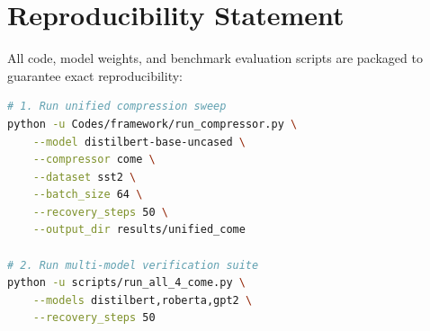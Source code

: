 \section{Reproducibility Statement}
All code, model weights, and benchmark evaluation scripts are packaged to guarantee exact reproducibility:
\begin{lstlisting}[language=bash]
# 1. Run unified compression sweep
python -u Codes/framework/run_compressor.py \
    --model distilbert-base-uncased \
    --compressor come \
    --dataset sst2 \
    --batch_size 64 \
    --recovery_steps 50 \
    --output_dir results/unified_come

# 2. Run multi-model verification suite
python -u scripts/run_all_4_come.py \
    --models distilbert,roberta,gpt2 \
    --recovery_steps 50
\end{lstlisting}
